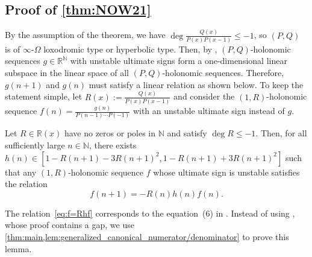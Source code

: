 \documentclass[a4paper,UKenglish,cleveref,autoref,thm-restate]{lipics-v2021}
\newcommand{\R}{\mathbb{R}}
\newcommand{\N}{\mathbb{N}}
\begin{document}
\subsection{Proof of \cref{thm:NOW21}}\label{sec:recovery_of_NOW21}

By the assumption of the theorem, we have $\deg \frac{Q(x)}{P(x)P(x-1)} \leq -1$, so $(P, Q)$ is of $\infty$-$\Omega$ loxodromic type or hyperbolic type. 
Then, by , $(P, Q)$-holonomic sequences $g \in \R^{\N}$ with unstable ultimate signs form a one-dimensional linear subspace in the linear space of all $(P, Q)$-holonomic sequences. 
Therefore, $g(n+1)$ and $g(n)$ must satisfy a linear relation as shown below. To keep the statement simple, let $R(x) := \frac{Q(x)}{P(x)P(x-1)}$ and consider the $(1, R)$-holonomic sequence $f(n) = \frac{g(n)}{P(n-1) \dotsm P(-1)}$ with an unstable ultimate sign instead of $g$. 



\begin{lemma}\label{lem:NOW21}
Let $R \in \R(x)$ have no zeros or poles in $\N$ and satisfy $\deg R \leq -1$. Then, for all sufficiently large $n \in \N$, there exists $h(n) \in [ 1-R(n+1) - 3R(n+1)^2, 1-R(n+1) + 3R(n+1)^2 ]$ such that any $(1, R)$-holonomic sequence $f$ whose ultimate sign is unstable satisfies the relation
\begin{equation}\label{eq:f=Rhf}
f(n+1) = - R(n)h(n) f(n). 
\end{equation}
\end{lemma}

The relation~\eqref{eq:f=Rhf} corresponds to the equation~(6) in \cite{NOW21}.
Instead of using \cite[Lemma 14]{NOW21}, whose proof contains a gap, we use \cref{thm:main,lem:generalized_canonical_numerator/denominator} to prove this lemma. 
\end{document}
